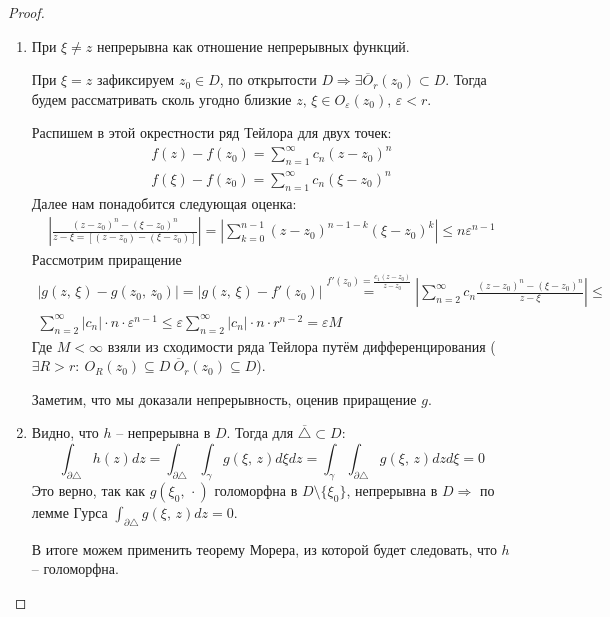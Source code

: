 \documentclass[a4paper,12pt]{article}
\renewcommand{\leq}{\ensuremath{\leqslant}}
\theoremstyle{plain}
\theoremstyle{definition}
\theoremstyle{remark}
\begin{document}
\begin{proof}
	\begin{enumerate}
		\item При $\xi \neq z$ непрерывна как отношение непрерывных функций.

		      При $\xi = z$ зафиксируем $z_0 \in D$, по открытости $D \Rightarrow \exists \overline{O}_r(z_0) \subset D$. Тогда будем рассматривать сколь угодно близкие $z,\, \xi \in O_\varepsilon(z_0),\, \varepsilon < r$.

		      Распишем в этой окрестности ряд Тейлора для двух точек:
		      \begin{align*}
			      f(z) - f(z_0) = \sum_{n = 1}^\infty c_n(z - z_0)^n \\
			      f(\xi) - f(z_0) = \sum_{n = 1}^\infty c_n(\xi - z_0)^n
		      \end{align*}
		      Далее нам понадобится следующая оценка:
		      \begin{align*}
			      \left\vert\frac{(z - z_0)^n - (\xi - z_0)^n}{z - \xi = [(z - z_0) - (\xi - z_0)]}\right\vert = \left\vert\sum_{k = 0}^{n - 1}(z - z_0)^{n - 1 - k}(\xi - z_0)^k\right\vert \leq n\varepsilon^{n-1}
		      \end{align*}
		      Рассмотрим приращение
		      \begin{align*}
			      \vert g(z,\, \xi) - g(z_0,\, z_0)\vert = \vert g(z,\, \xi) - f'(z_0)\vert \overset{f'(z_0) = \frac{c_1(z - z_0)}{z - z_0}}{=} \left\vert\sum_{n = 2}^\infty c_n \frac{(z - z_0)^n - (\xi - z_0)^n}{z - \xi}\right\vert \leq \\
			      \sum_{n = 2}^\infty \vert c_n\vert\cdot n\cdot\varepsilon^{n - 1} \leq \varepsilon\sum_{n = 2}^\infty \vert c_n\vert\cdot n\cdot r^{n - 2} = \varepsilon M
		      \end{align*}
		      Где $M < \infty$ взяли из сходимости ряда Тейлора путём дифференцирования ($\exists R > r :\: O_R(z_0) \subseteq D \: \overline{O}_r(z_0) \subseteq D$).

		      Заметим, что мы доказали непрерывность, оценив приращение $g$.
		\item Видно, что $h$ -- непрерывна в $D$. Тогда для $\overline{\triangle} \subset D$:
		      \[
			      \int_{\partial\triangle} h(z)dz = \int_{\partial\triangle}\int_\gamma g(\xi,\,z)d\xi dz = \int_\gamma\int_{\partial\triangle}g(\xi,\,z)dzd\xi = 0
		      \]
		      Это верно, так как $g(\xi_0,\, \cdot)$ голоморфна в $D \setminus \{\xi_0\}$, непрерывна в $D \Rightarrow$ по лемме Гурса $\int_{\partial\triangle}g(\xi,\,z)dz = 0$.

		      В итоге можем применить теорему Морера, из которой будет следовать, что $h$ -- голоморфна.
	\end{enumerate}
\end{proof}
\end{document}

